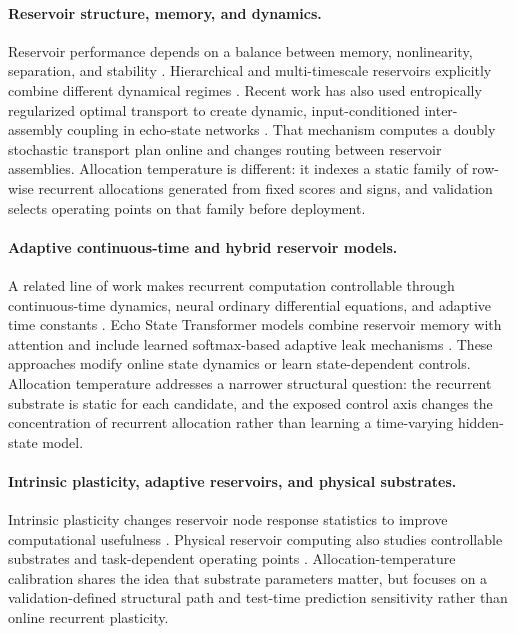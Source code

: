 \documentclass[11pt,a4paper]{article}
\begin{document}
\paragraph{Reservoir structure, memory, and dynamics.}
Reservoir performance depends on a balance between memory, nonlinearity, separation, and stability \citep{yildiz2012revisiting}. Hierarchical and multi-timescale reservoirs explicitly combine different dynamical regimes \citep{manneschi2021exploiting}. Recent work has also used entropically regularized optimal transport to create dynamic, input-conditioned inter-assembly coupling in echo-state networks \citep{singh2026ot}. That mechanism computes a doubly stochastic transport plan online and changes routing between reservoir assemblies. Allocation temperature is different: it indexes a static family of row-wise recurrent allocations generated from fixed scores and signs, and validation selects operating points on that family before deployment.

\paragraph{Adaptive continuous-time and hybrid reservoir models.}
A related line of work makes recurrent computation controllable through continuous-time dynamics, neural ordinary differential equations, and adaptive time constants \citep{chen2018neural,hasani2021liquid,hasani2022closed}. Echo State Transformer models combine reservoir memory with attention and include learned softmax-based adaptive leak mechanisms \citep{bendiouis2025est}. These approaches modify online state dynamics or learn state-dependent controls. Allocation temperature addresses a narrower structural question: the recurrent substrate is static for each candidate, and the exposed control axis changes the concentration of recurrent allocation rather than learning a time-varying hidden-state model.

\paragraph{Intrinsic plasticity, adaptive reservoirs, and physical substrates.}
Intrinsic plasticity changes reservoir node response statistics to improve computational usefulness \citep{schrauwen2008improving}. Physical reservoir computing also studies controllable substrates and task-dependent operating points \citep{appeltant2011information,tanaka2019recent,vandoorn2017model}. Allocation-temperature calibration shares the idea that substrate parameters matter, but focuses on a validation-defined structural path and test-time prediction sensitivity rather than online recurrent plasticity.
\end{document}
